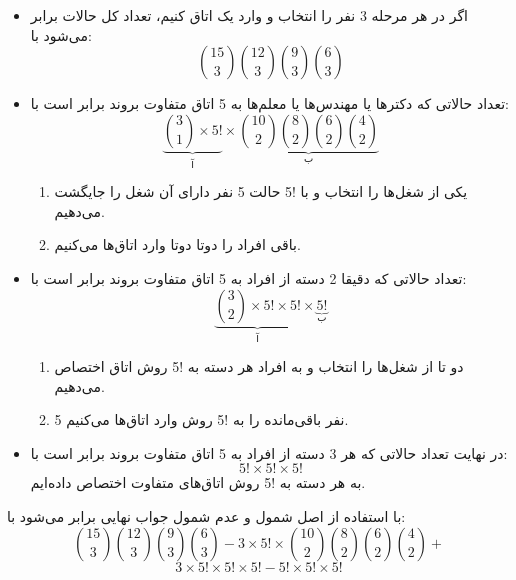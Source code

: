 \p
\begin{itemize}
    \item 
    اگر در هر مرحله 3 نفر را انتخاب و وارد یک اتاق کنیم، تعداد کل حالات برابر می‌شود با: 
    $$\binom{15}{3}\binom{12}{3}\binom{9}{3}\binom{6}{3}$$

    \item 
    تعداد حالاتی که دکترها یا مهندس‌ها یا معلم‌ها به 5 اتاق متفاوت بروند برابر است با:
    $$\underbrace{\binom{3}{1}\times5!}_{\text{آ}}\times\underbrace{\binom{10}{2}\binom{8}{2}\binom{6}{2}\binom{4}{2}}_{\text{ب}}$$
    \begin{enumerate}
     \item 
    یکی از شغل‌ها را انتخاب و با !5 حالت 5 نفر دارای آن شغل را جایگشت می‌دهیم.
    \item  
    باقی افراد را دو‌تا دو‌تا وارد اتاق‌ها می‌کنیم.
    \end{enumerate}
    \item 
    تعداد حالاتی که دقیقا 2 دسته از افراد به 5 اتاق متفاوت بروند برابر است با:
    $$\underbrace{\binom{3}{2}\times5!\times5!}_{\text{آ}}\times \underbrace{5!}_{\text{ب}}$$
    \begin{enumerate}
     \item
    دو تا از شغل‌ها را انتخاب و به افراد هر دسته به !5 روش اتاق اختصاص می‌دهیم.
    \item
      5 نفر باقی‌مانده را به !5 روش وارد اتاق‌ها می‌کنیم.
    \end{enumerate}
    \item 
     در نهایت تعداد حالاتی که هر 3 دسته از افراد به 5 اتاق متفاوت بروند برابر
    است با:
    $$5!\times5!\times5!$$
    به هر دسته به !5 روش اتاق‌های متفاوت اختصاص داده‌ایم.
\end{itemize}
    با استفاده از اصل شمول و عدم شمول جواب نهایی برابر می‌شود با:
    $$\binom{15}{3}\binom{12}{3}\binom{9}{3}\binom{6}{3}-3\times5!\times\binom{10}{2}\binom{8}{2}\binom{6}{2}\binom{4}{2}+$$
    $$3\times5!\times5!\times5!-5!\times5!\times5!$$

